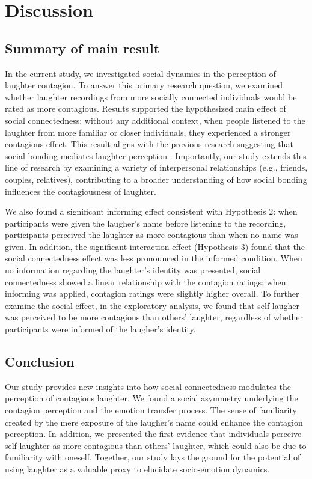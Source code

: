 \section{Discussion}
\subsection{Summary of main result}
In the current study, we investigated social dynamics in the perception of laughter contagion. To answer this primary research question, we examined whether laughter recordings from more socially connected individuals would be rated as more contagious. Results supported the hypothesized main effect of social connectedness: without any additional context, when people listened to the laughter from more familiar or closer individuals, they experienced a stronger contagious effect. This result aligns with the previous research suggesting that social bonding mediates laughter perception \citep{smoski2003antiphonal}. Importantly, our study extends this line of research by examining a variety of interpersonal relationships (e.g., friends, couples, relatives), contributing to a broader understanding of how social bonding influences the contagiousness of laughter.

We also found a significant informing effect consistent with Hypothesis 2: when participants were given the laugher’s name before listening to the recording, participants perceived the laughter as more contagious than when no name was given. In addition, the significant interaction effect (Hypothesis 3) found that the social connectedness effect was less pronounced in the informed condition. When no information regarding the laughter’s identity was presented, social connectedness showed a linear relationship with the contagion ratings; when informing was applied, contagion ratings were slightly higher overall. To further examine the social effect, in the exploratory analysis, we found that self-laugher was perceived to be more contagious than others’ laughter, regardless of whether participants were informed of the laugher’s identity.

\subsection{Conclusion}
Our study provides new insights into how social connectedness modulates the perception of contagious laughter. We found a social asymmetry underlying the contagion perception and the emotion transfer process. The sense of familiarity created by the mere exposure of the laugher’s name could enhance the contagion perception. In addition, we presented the first evidence that individuals perceive self-laughter as more contagious than others’ laughter, which could also be due to familiarity with oneself. Together, our study lays the ground for the potential of using laughter as a valuable proxy to elucidate socio-emotion dynamics.

